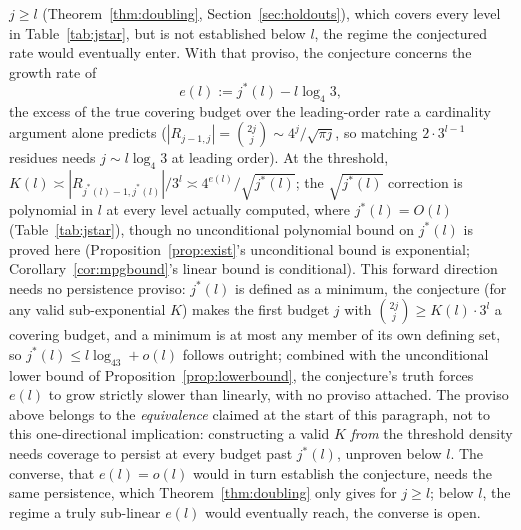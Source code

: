 \documentclass[11pt]{amsart}
\theoremstyle{plain}
\theoremstyle{definition}
\theoremstyle{remark}
\begin{document}
$j\ge l$ (Theorem~\ref{thm:doubling}, Section~\ref{sec:holdouts}), which covers every level in
Table~\ref{tab:jstar}, but is not established below $l$, the regime the conjectured rate would
eventually enter. With that proviso, the conjecture concerns the growth rate of
\begin{equation}
\label{eq:el}
e(l) := j^*(l) - l\log_4 3,
\end{equation}
the excess of the true covering budget over the leading-order rate a cardinality argument alone
predicts ($|R_{j-1,j}| = \binom{2j}{j} \sim 4^j/\sqrt{\pi j}$, so matching $2\cdot3^{l-1}$ residues
needs $j \sim l\log_4 3$ at leading order). At the threshold,
$K(l) \asymp |R_{j^*(l)-1,j^*(l)}|/3^l \asymp 4^{e(l)}/\sqrt{j^*(l)}$; the $\sqrt{j^*(l)}$ correction
is polynomial in $l$ at every level actually computed, where $j^*(l)=O(l)$ (Table~\ref{tab:jstar}),
though no unconditional polynomial bound on $j^*(l)$ is proved here (Proposition~\ref{prop:exist}'s
unconditional bound is exponential; Corollary~\ref{cor:mpgbound}'s linear bound is conditional). This forward direction needs no persistence proviso: $j^*(l)$ is defined as a minimum, the conjecture
(for any valid sub-exponential $K$) makes the first budget $j$ with $\binom{2j}{j}\ge K(l)\cdot3^l$ a
covering budget, and a minimum is at most any member of its own defining set, so
$j^*(l)\le l\log_43+o(l)$ follows outright; combined with the unconditional lower bound of
Proposition~\ref{prop:lowerbound}, the conjecture's truth forces $e(l)$ to grow strictly slower than
linearly, with no proviso attached. The proviso above belongs to the \emph{equivalence} claimed at the
start of this paragraph, not to this one-directional implication: constructing a valid $K$ \emph{from}
the threshold density needs coverage to persist at every budget past $j^*(l)$, unproven below $l$. The
converse, that $e(l)=o(l)$ would in turn establish the conjecture, needs the same persistence, which
Theorem~\ref{thm:doubling} only gives for $j\ge l$; below $l$, the regime a truly sub-linear $e(l)$
would eventually reach, the converse is open.
\end{document}
